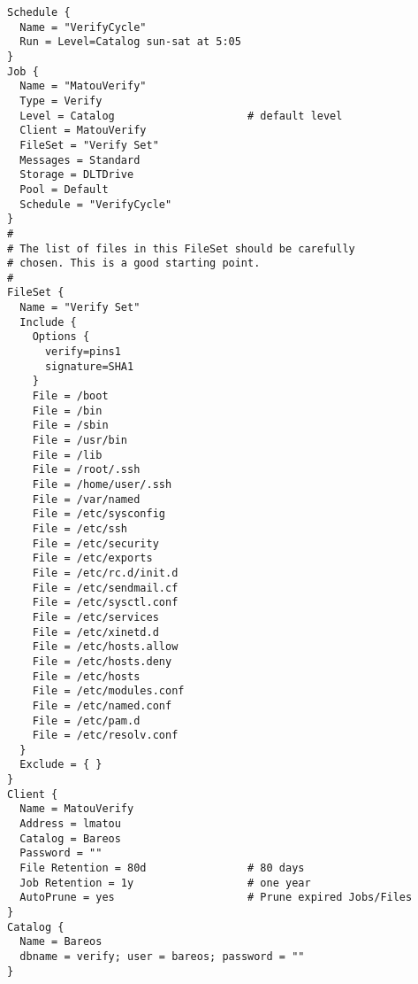 \footnotesize
\begin{verbatim}
Schedule {
  Name = "VerifyCycle"
  Run = Level=Catalog sun-sat at 5:05
}
Job {
  Name = "MatouVerify"
  Type = Verify
  Level = Catalog                     # default level
  Client = MatouVerify
  FileSet = "Verify Set"
  Messages = Standard
  Storage = DLTDrive
  Pool = Default
  Schedule = "VerifyCycle"
}
#
# The list of files in this FileSet should be carefully
# chosen. This is a good starting point.
#
FileSet {
  Name = "Verify Set"
  Include {
    Options {
      verify=pins1
      signature=SHA1
    }
    File = /boot
    File = /bin
    File = /sbin
    File = /usr/bin
    File = /lib
    File = /root/.ssh
    File = /home/user/.ssh
    File = /var/named
    File = /etc/sysconfig
    File = /etc/ssh
    File = /etc/security
    File = /etc/exports
    File = /etc/rc.d/init.d
    File = /etc/sendmail.cf
    File = /etc/sysctl.conf
    File = /etc/services
    File = /etc/xinetd.d
    File = /etc/hosts.allow
    File = /etc/hosts.deny
    File = /etc/hosts
    File = /etc/modules.conf
    File = /etc/named.conf
    File = /etc/pam.d
    File = /etc/resolv.conf
  }
  Exclude = { }
}
Client {
  Name = MatouVerify
  Address = lmatou
  Catalog = Bareos
  Password = ""
  File Retention = 80d                # 80 days
  Job Retention = 1y                  # one year
  AutoPrune = yes                     # Prune expired Jobs/Files
}
Catalog {
  Name = Bareos
  dbname = verify; user = bareos; password = ""
}
\end{verbatim}
\normalsize
